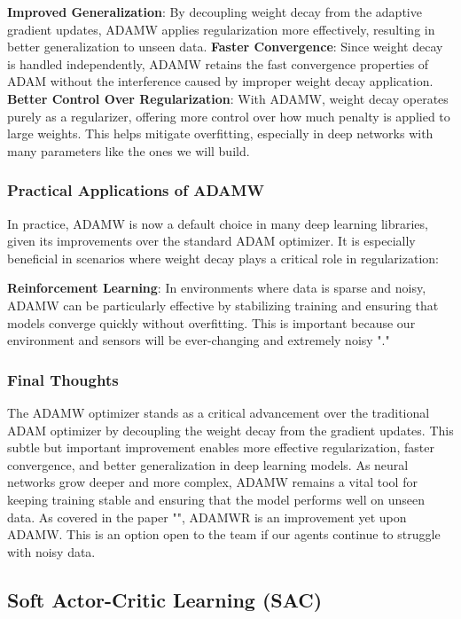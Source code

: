 \textbf{Improved Generalization}: By decoupling weight decay from the adaptive gradient updates, ADAMW applies regularization more effectively, resulting in better generalization to unseen data.
\textbf{Faster Convergence}: Since weight decay is handled independently, ADAMW retains the fast convergence properties of ADAM without the interference caused by improper weight decay application.
\textbf{Better Control Over Regularization}: With ADAMW, weight decay operates purely as a regularizer, offering more control over how much penalty is applied to large weights. This helps mitigate overfitting, especially in deep networks with many parameters like the ones we will build.

\subsubsection*{Practical Applications of ADAMW}

In practice, ADAMW is now a default choice in many deep learning libraries, given its improvements over the standard ADAM optimizer. It is especially beneficial in scenarios where weight decay plays a critical role in regularization:

\textbf{Reinforcement Learning}: In environments where data is sparse and noisy, ADAMW can be particularly effective by stabilizing training and ensuring that models converge quickly without overfitting. This is important because our environment and sensors will be ever-changing and extremely noisy "\cite{loshchilov2019decoupledweightdecayregularization}."

\subsubsection*{Final Thoughts}

The ADAMW optimizer stands as a critical advancement over the traditional ADAM optimizer by decoupling the weight decay from the gradient updates. This subtle but important improvement enables more effective regularization, faster convergence, and better generalization in deep learning models. As neural networks grow deeper and more complex, ADAMW remains a vital tool for keeping training stable and ensuring that the model performs well on unseen data. As covered in the paper "\cite{loshchilov2019decoupledweightdecayregularization}", ADAMWR is an improvement yet upon ADAMW. This is an option open to the team if our agents continue to struggle with noisy data. 

\subsection*{Soft Actor-Critic Learning (SAC)}

